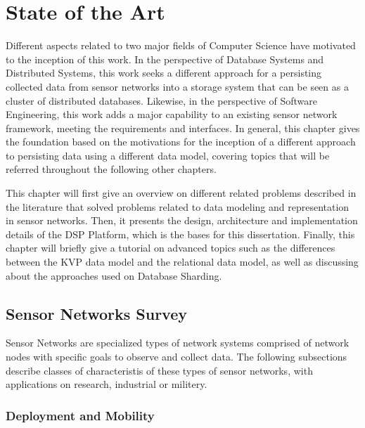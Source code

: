 

\chapter{State of the Art}

Different aspects related to two major fields of Computer Science have
motivated to the inception of this work. In the perspective of Database
Systems and Distributed Systems, this work seeks a different approach for a
persisting collected data from sensor networks into a storage system that can
be seen as a cluster of distributed databases. Likewise, in the perspective of
Software Engineering, this work adds a major capability to an existing sensor 
network framework, meeting the requirements and interfaces. In general, this 
chapter gives the foundation based on the motivations for the inception of a 
different approach to persisting data using a different data model, covering 
topics that will be referred throughout the following other chapters.

This chapter will first give an overview on different related problems
described  in the literature that solved problems related to data modeling and 
representation in sensor networks. Then, it presents the design, architecture 
and implementation details of the DSP Platform, which is the bases for this 
dissertation. Finally, this chapter will briefly give a tutorial on advanced 
topics such as the differences between the KVP data model and the relational 
data model, as well as discussing about the approaches used on Database
Sharding.

\section{Sensor Networks Survey}

Sensor Networks are specialized types of network systems comprised of network 
nodes with specific goals to observe and collect data. The following
subsections describe classes of characteristis of these types of sensor
networks, with applications on research, industrial or militery.

\subsection{Deployment and Mobility}

